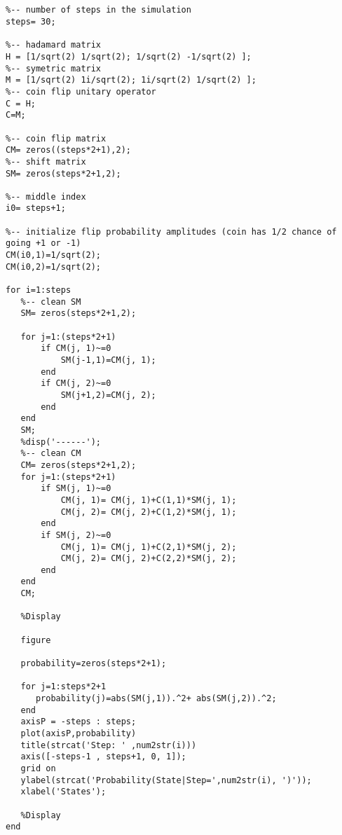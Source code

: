 \label{ap:a}


\begin{lstlisting}


%-- number of steps in the simulation 
steps= 30;

%-- hadamard matrix
H = [1/sqrt(2) 1/sqrt(2); 1/sqrt(2) -1/sqrt(2) ];
%-- symetric matrix
M = [1/sqrt(2) 1i/sqrt(2); 1i/sqrt(2) 1/sqrt(2) ];
%-- coin flip unitary operator
C = H;
C=M;

%-- coin flip matrix
CM= zeros((steps*2+1),2);
%-- shift matrix
SM= zeros(steps*2+1,2);

%-- middle index
i0= steps+1;

%-- initialize flip probability amplitudes (coin has 1/2 chance of going +1 or -1)
CM(i0,1)=1/sqrt(2);
CM(i0,2)=1/sqrt(2);

for i=1:steps
   %-- clean SM
   SM= zeros(steps*2+1,2);
   
   for j=1:(steps*2+1)
       if CM(j, 1)~=0
           SM(j-1,1)=CM(j, 1);
       end
       if CM(j, 2)~=0
           SM(j+1,2)=CM(j, 2);
       end
   end
   SM;
   %disp('------');
   %-- clean CM
   CM= zeros(steps*2+1,2);
   for j=1:(steps*2+1)
       if SM(j, 1)~=0
           CM(j, 1)= CM(j, 1)+C(1,1)*SM(j, 1);
           CM(j, 2)= CM(j, 2)+C(1,2)*SM(j, 1);
       end
       if SM(j, 2)~=0
           CM(j, 1)= CM(j, 1)+C(2,1)*SM(j, 2);
           CM(j, 2)= CM(j, 2)+C(2,2)*SM(j, 2);
       end
   end
   CM;
   
   %Display
   
   figure
   
   probability=zeros(steps*2+1);

   for j=1:steps*2+1
      probability(j)=abs(SM(j,1)).^2+ abs(SM(j,2)).^2;
   end
   axisP = -steps : steps;
   plot(axisP,probability)
   title(strcat('Step: ' ,num2str(i)))
   axis([-steps-1 , steps+1, 0, 1]);
   grid on
   ylabel(strcat('Probability(State|Step=',num2str(i), ')'));
   xlabel('States');
   
   %Display
end



\end{lstlisting}
